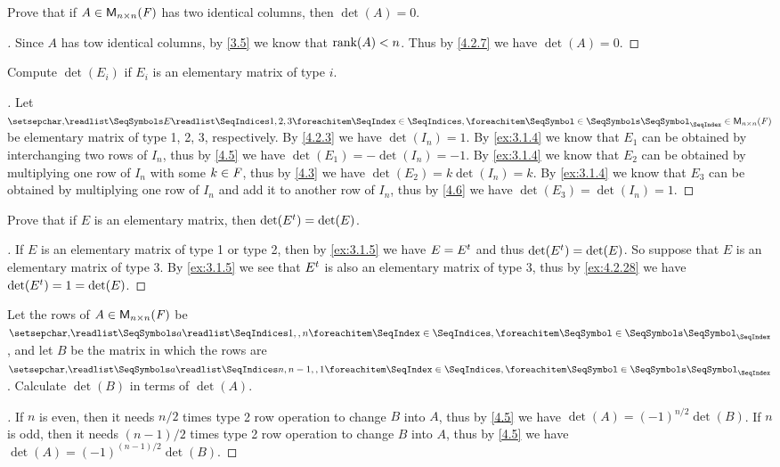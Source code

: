 \begin{ex}\label{ex:4.2.27}
  Prove that if \(A \in \mathsf{M}_{{n} \times n}({\mathit{F}})\) has two identical columns, then \(\det(A) = 0\).
\end{ex}

\begin{proof}[]
  Since \(A\) has tow identical columns, by \cref{3.5} we know that \(\rk{A} < n\).
  Thus by \cref{4.2.7} we have \(\det(A) = 0\).
\end{proof}

\begin{ex}\label{ex:4.2.28}
  Compute \(\det(E_i)\) if \(E_i\) is an elementary matrix of type \(i\).
\end{ex}

\begin{proof}[]
  Let \(\seq{E}{1,2,3} \in \ms{n}{n}{\F}\) be elementary matrix of type 1, 2, 3, respectively.
  By \cref{4.2.3} we have \(\det(I_n) = 1\).
  By \cref{ex:3.1.4} we know that \(E_1\) can be obtained by interchanging two rows of \(I_n\), thus by \cref{4.5} we have \(\det(E_1) = -\det(I_n) = -1\).
  By \cref{ex:3.1.4} we know that \(E_2\) can be obtained by multiplying one row of \(I_n\) with some \(k \in \mathit{F}\), thus by \cref{4.3} we have \(\det(E_2) = k \det(I_n) = k\).
  By \cref{ex:3.1.4} we know that \(E_3\) can be obtained by multiplying one row of \(I_n\) and add it to another row of \(I_n\), thus by \cref{4.6} we have \(\det(E_3) = \det(I_n) = 1\).
\end{proof}

\begin{ex}\label{ex:4.2.29}
  Prove that if \(E\) is an elementary matrix, then \(\det({E}^{t}) = \det(E)\).
\end{ex}

\begin{proof}[]
  If \(E\) is an elementary matrix of type 1 or type 2, then by \cref{ex:3.1.5} we have \(E = {E}^{t}\) and thus \(\det({E}^{t}) = \det(E)\).
  So suppose that \(E\) is an elementary matrix of type 3.
  By \cref{ex:3.1.5} we see that \({E}^{t}\) is also an elementary matrix of type 3, thus by \cref{ex:4.2.28} we have \(\det({E}^{t}) = 1 = \det(E)\).
\end{proof}

\begin{ex}\label{ex:4.2.30}
  Let the rows of \(A \in \mathsf{M}_{{n} \times n}({\mathit{F}})\) be \(\seq{a}{1,,n}\), and let \(B\) be the matrix in which the rows are \(\seq{a}{n,n-1,,1}\).
  Calculate \(\det(B)\) in terms of \(\det(A)\).
\end{ex}

\begin{proof}[]
  If \(n\) is even, then it needs \(n / 2\) times type 2 row operation to change \(B\) into \(A\), thus by \cref{4.5} we have \(\det(A) = (-1)^{n / 2} \det(B)\).
  If \(n\) is odd, then it needs \((n - 1) / 2\) times type 2 row operation to change \(B\) into \(A\), thus by \cref{4.5} we have \(\det(A) = (-1)^{(n - 1) / 2} \det(B)\).
\end{proof}
